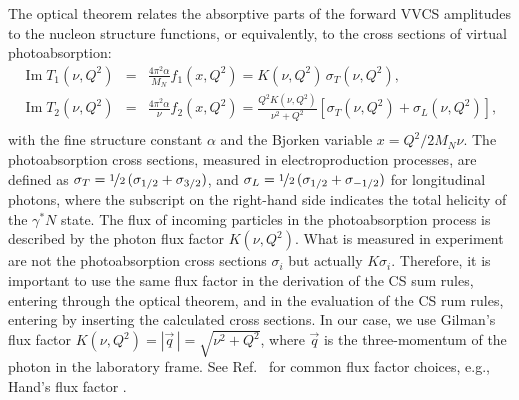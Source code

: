 \documentclass[11pt,preprint,tightenlines,
showpacs,preprintnumbers,amsmath,amssymb,superscriptaddress,a4paper,nofootinbib]{revtex4-1}
\def\bea{\begin{eqnarray}}
\def\eea{\end{eqnarray}}
\def\eqlab#1{\label{eq:#1}}
\def\al{\alpha}
\DeclareMathOperator\im{Im}
\begin{document}
The optical theorem relates the absorptive parts of the forward VVCS amplitudes to the nucleon structure functions, or equivalently, to the cross sections of virtual photoabsorption:
\begin{subequations}
\eqlab{VVCSunitarity}
\bea
\im T_1(\nu,Q^2)&=&\frac{4\pi^2\al}{M_N}f_1(x,Q^2) \eqlab{ImT1}=K(\nu,Q^2)\,\sigma_T(\nu,Q^2), \\
\im T_2(\nu,Q^2)&=&\frac{4\pi^2\al}{\nu}f_2(x,Q^2)\eqlab{ImT2}=\frac{Q^2  K(\nu,Q^2) }{\nu^2+Q^2}\left[\sigma_T(\nu,Q^2)+\sigma_L(\nu,Q^2)\right], \\
\eea
\end{subequations}
with the fine structure constant $\alpha$ and the Bjorken variable $x=Q^2/2M_N \nu$. The photoabsorption cross sections, measured in electroproduction processes, are defined as $\sigma_T=\nicefrac12\, (\sigma_{1/2}+\sigma_{3/2})$, and $\sigma_L=\nicefrac12\, (\sigma_{1/2}+\sigma_{-1/2})$ for longitudinal photons, where the subscript on the right-hand side indicates the total helicity of the $\gamma^\ast N$ state. 
The flux of incoming particles in the photoabsorption process is described by the photon flux factor $K(\nu,Q^2)$. What is measured in experiment are not the photoabsorption cross sections $\sigma_i$ but actually $K \sigma_i$. Therefore, it is important to use the same flux factor in the derivation of the CS sum rules, entering through the optical theorem, and in the evaluation of the CS rum rules, entering by inserting the calculated cross sections. In our case, we use  Gilman's flux factor $K(\nu,Q^2)=|\vec{q}\,|=\sqrt{\nu^2+Q^2}$, where  $\vec{q}$ is the three-momentum of the photon in the laboratory frame. See Ref.~\cite{Drechsel:2002ar} for common flux factor choices, e.g., Hand's flux factor \cite{Hand:1963bb}.
\end{document}
